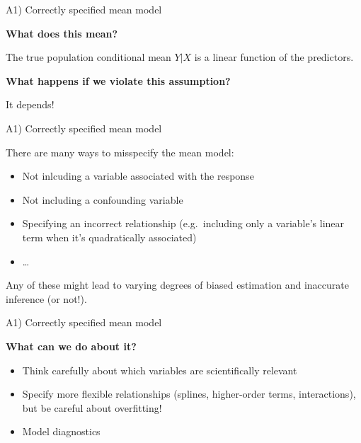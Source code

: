 \documentclass[12pt,ignorenonframetext,]{beamer}
\providecommand{\tightlist}{%
\setlength{\itemsep}{0pt}\setlength{\parskip}{0pt}}
\begin{document}
\begin{frame}{A1) Correctly specified mean model}

\textbf{What does this mean?}

The true population conditional mean \(Y|X\) is a linear function of the
predictors.

\pause

\textbf{What happens if we violate this assumption?}

It depends!

\end{frame}

\begin{frame}{A1) Correctly specified mean model}

There are many ways to misspecify the mean model:

\begin{itemize}
\tightlist
\item
  Not inlcuding a variable associated with the response
\item
  Not including a confounding variable\\
\item
  Specifying an incorrect relationship (e.g.~including only a variable's
  linear term when it's quadratically associated)
\item
  \ldots{}
\end{itemize}

Any of these might lead to varying degrees of biased estimation and
inaccurate inference (or not!).

\end{frame}

\begin{frame}{A1) Correctly specified mean model}

\textbf{What can we do about it?}

\begin{itemize}
\tightlist
\item
  Think carefully about which variables are scientifically relevant
\item
  Specify more flexible relationships (splines, higher-order terms,
  interactions), but be careful about overfitting!
\item
  Model diagnostics
\end{itemize}

\end{frame}
\end{document}
